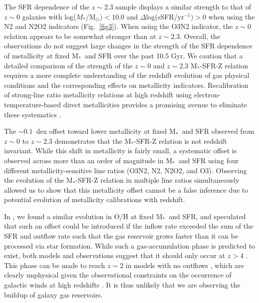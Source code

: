 \documentclass[iop,twocolappendix]{emulateapj}
\newcommand{\mstar}{$\mbox{M}_*$}
\begin{document}
The SFR dependence of the $z\sim2.3$ sample displays a similar strength to that of $z\sim0$
 galaxies with log($M_*$/M$_{\odot})<10.0$ and $\Delta$log(sSFR/yr$^{-1})>0$ when using
 the N2 and N2O2 indicators (Fig.~\ref{fig3}).  When using the O3N2 indicator, the $z\sim0$ relation appears to be
 somewhat stronger than at $z\sim2.3$.  Overall, the observations do not suggest large changes in the
 strength of the SFR dependence of metallicity at fixed \mstar\ and SFR over the past 10.5 Gyr.
  We caution that a detailed comparison of the strength of the $z\sim0$ and $z\sim2.3$
 \mstar-SFR-Z relation requires a more complete understanding of the redshift evolution of
 gas physical conditions and the corresponding effects on metallicity indicators.
  Recalibration of strong-line ratio metallicity relations at high redshift using
 electron-temperature-based direct metallicities provides a promising avenue to
 eliminate these systematics \citep[e.g.,][]{jon15,san16b}.

The $\sim0.1$~dex offset toward lower metallicity at fixed \mstar\ and SFR observed
 from $z\sim0$ to $z\sim2.3$ demonstrates that the \mstar-SFR-Z relation is not redshift invariant.
  While this shift in metallicity is fairly small, a systematic offset is observed across more than an
 order of magnitude in \mstar\ and SFR using four different metallicity-sensitive line ratios
 (O3N2, N2, N2O2, and O3).  Observing the evolution of the \mstar-SFR-Z relation in multiple
 line ratios simultaneously allowed us to show that this metallicity offset cannot be a false inference
 due to potential evolution of metallicity calibrations with redshift.

In \citet{san15}, we found a similar evolution in O/H at fixed \mstar\ and SFR, and speculated
 that such an offset could be introduced if the inflow rate exceeded the sum of the SFR
 and outflow rate such that the gas reservoir grows faster than it can be processed via
 star formation.  While such a gas-accumulation phase is predicted to exist, both models
 and observations suggest that it should only occur at $z>4$ \citep{dav12,pap11}.
  This phase can be made to reach $z\sim2$ in models with no outflows \citep{dav12},
 which are clearly unphysical given the observational constraints on the occurrence of
 galactic winds at high redshifts \citep[e.g.,][]{ste10}.  It is thus unlikely that
 we are observing the buildup of galaxy gas reservoirs.
\end{document}
